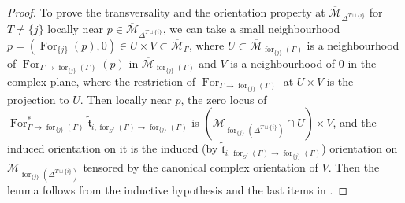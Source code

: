 \documentclass[11pt]{amsart}
\theoremstyle{definition}
\theoremstyle{remark}
\renewcommand{\for}{\operatorname{for}}
\newcommand{\For}{\operatorname{For}}
\newcommand{\<}{\left<}
\renewcommand{\>}{\right>}
\numberwithin{equation}{section}
\def\Mbar{{\overline{\mathcal M}}}
\begin{document}
\begin{proof}
To prove the transversality and the orientation property at $\Mbar_{\Delta^{{T\sqcup\{i\}}}}$ for %
$T\ne \{j\}$ locally %
near $p\in \Mbar_{\Delta^{{T\sqcup\{i\}}}}$, we can take a small neighbourhood $p=(\For_{\{j\}}(p),0)\in U\times V \subset \Mbar_{\Gamma}$, where $U\subset \Mbar_{\for_{\{j\}}(\Gamma)}$ is a neighbourhood of $\For_{\Gamma \to \for_{\{j\}}(\Gamma)}(p)$ in $ \Mbar_{\for_{\{j\}}(\Gamma)}$ and $V$ is a neighbourhood of 0 in the complex plane, where the restriction of $\For_{\Gamma \to \for_{\{j\}}(\Gamma)}$ at $U\times V$ is the projection to $U$. Then locally near $p$, the zero locus of $\For_{\Gamma\to \for_{\{j\}}(\Gamma)}^* \tilde{\mathfrak t}_{i,\for_{S^I}(\Gamma)\to \for_{\{j\}}(\Gamma)}$ is $(\mathcal M_{\for_{\{j\}}(\Delta^{T\sqcup\{i\}})}\cap U)\times V$, and the induced orientation on it is the %
induced (by $\tilde{\mathfrak t}_{i,\for_{S^I}(\Gamma)\to\for_{\{j\}}(\Gamma)}$) orientation on %
$\mathcal M_{\for_{\{j\}}(\Delta^{T\sqcup\{i\}})}$ tensored by the canonical complex orientation of $V$. %
Then the lemma follows %
from the inductive hypothesis and the last items %
in \cite[Propositions 3.1 and 3.3]{TZ1}.

\end{proof}
\end{document}
